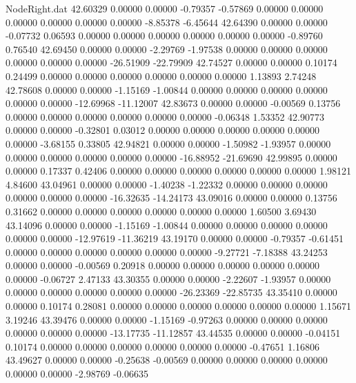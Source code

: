 \begin{filecontents}{NodeRight.dat}
  42.60329    0.00000    0.00000    -0.79357   -0.57869    0.00000    0.00000    0.00000    0.00000    0.00000    0.00000   -8.85378   -6.45644
  42.64390    0.00000    0.00000    -0.07732    0.06593    0.00000    0.00000    0.00000    0.00000    0.00000    0.00000   -0.89760    0.76540
  42.69450    0.00000    0.00000    -2.29769   -1.97538    0.00000    0.00000    0.00000    0.00000    0.00000    0.00000  -26.51909  -22.79909
  42.74527    0.00000    0.00000     0.10174    0.24499    0.00000    0.00000    0.00000    0.00000    0.00000    0.00000    1.13893    2.74248
  42.78608    0.00000    0.00000    -1.15169   -1.00844    0.00000    0.00000    0.00000    0.00000    0.00000    0.00000  -12.69968  -11.12007
  42.83673    0.00000    0.00000    -0.00569    0.13756    0.00000    0.00000    0.00000    0.00000    0.00000    0.00000   -0.06348    1.53352
  42.90773    0.00000    0.00000    -0.32801    0.03012    0.00000    0.00000    0.00000    0.00000    0.00000    0.00000   -3.68155    0.33805
  42.94821    0.00000    0.00000    -1.50982   -1.93957    0.00000    0.00000    0.00000    0.00000    0.00000    0.00000  -16.88952  -21.69690
  42.99895    0.00000    0.00000     0.17337    0.42406    0.00000    0.00000    0.00000    0.00000    0.00000    0.00000    1.98121    4.84600
  43.04961    0.00000    0.00000    -1.40238   -1.22332    0.00000    0.00000    0.00000    0.00000    0.00000    0.00000  -16.32635  -14.24173
  43.09016    0.00000    0.00000     0.13756    0.31662    0.00000    0.00000    0.00000    0.00000    0.00000    0.00000    1.60500    3.69430
  43.14096    0.00000    0.00000    -1.15169   -1.00844    0.00000    0.00000    0.00000    0.00000    0.00000    0.00000  -12.97619  -11.36219
  43.19170    0.00000    0.00000    -0.79357   -0.61451    0.00000    0.00000    0.00000    0.00000    0.00000    0.00000   -9.27721   -7.18388
  43.24253    0.00000    0.00000    -0.00569    0.20918    0.00000    0.00000    0.00000    0.00000    0.00000    0.00000   -0.06727    2.47133
  43.30355    0.00000    0.00000    -2.22607   -1.93957    0.00000    0.00000    0.00000    0.00000    0.00000    0.00000  -26.23369  -22.85735
  43.35410    0.00000    0.00000     0.10174    0.28081    0.00000    0.00000    0.00000    0.00000    0.00000    0.00000    1.15671    3.19246
  43.39476    0.00000    0.00000    -1.15169   -0.97263    0.00000    0.00000    0.00000    0.00000    0.00000    0.00000  -13.17735  -11.12857
  43.44535    0.00000    0.00000    -0.04151    0.10174    0.00000    0.00000    0.00000    0.00000    0.00000    0.00000   -0.47651    1.16806
  43.49627    0.00000    0.00000    -0.25638   -0.00569    0.00000    0.00000    0.00000    0.00000    0.00000    0.00000   -2.98769   -0.06635

\end{filecontents}
